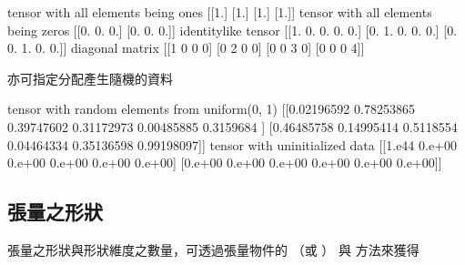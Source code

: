 \documentclass[letterpaper,10pt,english]{sphinxmanual}
\begin{document}
\begin{sphinxVerbatim}[commandchars=\\\{\}]
tensor with all elements being ones 
 [[1.]
 [1.]
 [1.]
 [1.]]
tensor with all elements being zeros 
 [[0. 0. 0.]
 [0. 0. 0.]]
identity\PYGZhy{}like tensor 
 [[1. 0. 0. 0. 0.]
 [0. 1. 0. 0. 0.]
 [0. 0. 1. 0. 0.]]
diagonal matrix 
 [[1 0 0 0]
 [0 2 0 0]
 [0 0 3 0]
 [0 0 0 4]]
\end{sphinxVerbatim}

 亦可指定分配產生隨機的資料

\begin{sphinxVerbatim}[commandchars=\\\{\}]
         
         
\end{sphinxVerbatim}

\begin{sphinxVerbatim}[commandchars=\\\{\}]
tensor with random elements from uniform(0, 1) 
 [[0.02196592 0.78253865 0.39747602 0.31172973 0.00485885 0.3159684 ]
 [0.46485758 0.14995414 0.5118554  0.04464334 0.35136598 0.99198097]]
tensor with uninitialized data 
 [[1.e\PYGZhy{}44 0.e+00 0.e+00 0.e+00 0.e+00 0.e+00]
 [0.e+00 0.e+00 0.e+00 0.e+00 0.e+00 0.e+00]]
\end{sphinxVerbatim}


\subsection{張量之形狀}
\label{\detokenize{notebook/lab-torch-tensor:id4}}
張量之形狀與形狀維度之數量，可透過張量物件的 （或 ） 與  方法來獲得

\begin{sphinxVerbatim}[commandchars=\\\{\}]
 
 
 
\end{sphinxVerbatim}
\end{document}
